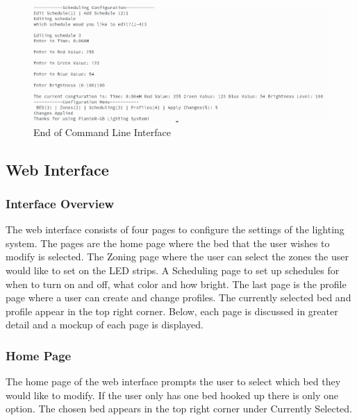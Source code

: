 \begin{center}
			            \begin{figure}[H]
			                \includegraphics[width=\linewidth]{comand_line_interface/Selection_005.png}
			                \caption{End of Command Line Interface}
			                \label{fig:End of Command Line Interface}
			            \end{figure}
			        \end{center}

			        \subsection{Web Interface}
			            \subsubsection{Interface Overview}
			            The web interface consists of four pages to configure the settings of
			            the lighting system. The pages are the home page where the bed that the user
			            wishes to modify is selected. The Zoning page where the user can select
			            the zones the user would like to set on the LED strips. A Scheduling page
			            to set up schedules for when to turn on and off, what color and how bright.
			            The last page is the profile page where a user can create and change profiles.
			            The currently selected bed and profile appear in the top right corner.
			            Below, each page is discussed in greater detail and a mockup of each page
			            is displayed.
			            \subsubsection{Home Page}
			            The home page of the web interface prompts the user to select which
			            bed they would like to modify. If the user only has one bed hooked up there
			            is only one option. The chosen bed appears in the top right corner under Currently
			            Selected.
